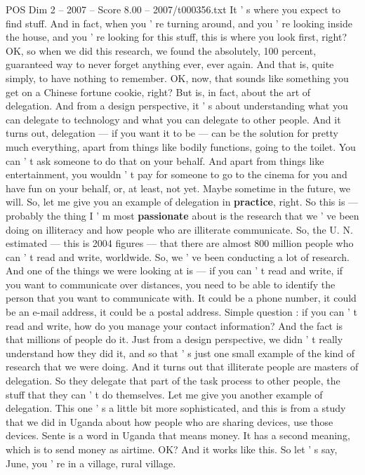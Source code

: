 \begin{textsample}{POS Dim 2 – 2007 – Score 8.00 – 2007/t000356.txt}
It ' s where you expect to find stuff.
And in fact, when you ' re turning around, and you ' re looking inside the house, and you ' re looking for this stuff, this is where you look first, right?
OK, so when we did this research, we found the absolutely, 100 percent, guaranteed way to never forget anything ever, ever again.
And that is, quite simply, to have nothing to remember.
OK, now, that sounds like something you get on a Chinese fortune cookie, right?
But is, in fact, about the art of delegation.
And from a design perspective, it ' s about understanding what you can delegate to technology and what you can delegate to other people.
And it turns out, delegation — if you want it to be — can be the solution for pretty much everything, apart from things like bodily functions, going to the toilet.
You can ' t ask someone to do that on your behalf.
And apart from things like entertainment, you wouldn ' t pay for someone to go to the cinema for you and have fun on your behalf, or, at least, not yet.
Maybe sometime in the future, we will.
So, let me give you an example of delegation in \textbf{practice}, right.
So this is — probably the thing I ' m most \textbf{passionate} about is the research that we ' ve been doing on illiteracy and how people who are illiterate communicate.
So, the U.
N. estimated — this is 2004 figures — that there are almost 800 million people who can ' t read and write, worldwide.
So, we ' ve been conducting a lot of research.
And one of the things we were looking at is — if you can ' t read and write, if you want to communicate over distances, you need to be able to identify the person that you want to communicate with.
It could be a phone number, it could be an e-mail address, it could be a postal address.
Simple question : if you can ' t read and write, how do you manage your contact information?
And the fact is that millions of people do it.
Just from a design perspective, we didn ' t really understand how they did it, and so that ' s just one small example of the kind of research that we were doing.
And it turns out that illiterate people are masters of delegation.
So they delegate that part of the task process to other people, the stuff that they can ' t do themselves.
Let me give you another example of delegation.
This one ' s a little bit more sophisticated, and this is from a study that we did in Uganda about how people who are sharing devices, use those devices.
Sente is a word in Uganda that means money.
It has a second meaning, which is to send money as airtime.
OK?
And it works like this.
So let ' s say, June, you ' re in a village, rural village.

\end{textsample}

